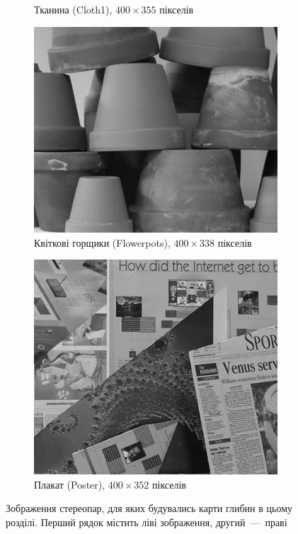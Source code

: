 \begin{figure}[h]
\begin{subfigure}[t]{0.32\textwidth}
        \caption{Тканина (Cloth1), $400 \times 355$ пікселів}
        \label{fig:cloth:right}
    \end{subfigure}
    \hfill
    \begin{subfigure}[t]{0.32\textwidth}
        \centering
        \includegraphics[width=\textwidth]{images/pots_right}
        \caption{Квіткові горщики (Flowerpots), $400 \times 338$ пікселів}
        \label{fig:flowerpots:right}
    \end{subfigure}
    \hfill
    \begin{subfigure}[t]{0.32\textwidth}
        \centering
        \includegraphics[width=\textwidth]{images/poster_right}
        \caption{Плакат (Poster), $400 \times 352$ пікселів}
        \label{fig:poster:right}
    \end{subfigure}
    \caption{Зображення стереопар,
             для яких будувались карти глибин в цьому розділі.
             Перший рядок містить ліві зображення, другий~---~праві}
    \label{fig:stereopair}
\end{figure}

